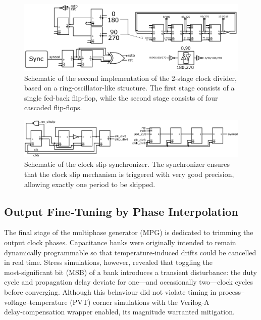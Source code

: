 \begin{figure}[H]
  \centering
  \includegraphics[width=\linewidth]{figures/Schematics/div_V2_complete.png}
  \caption{Schematic of the second implementation of the 2-stage clock divider, based on a ring-oscillator-like structure. The first stage consists of a single fed-back flip-flop, while the second stage consists of four cascaded flip-flops.}
  \label{fig:div_V2_complete}
\end{figure}
\begin{figure}[H]
  \centering
  \includegraphics[width=\linewidth]{figures/Schematics/sync_complete.png}
  \caption{Schematic of the clock slip synchronizer. The synchronizer ensures that the clock slip mechanism is triggered with very good precision, allowing exactly one period to be skipped.}
  \label{fig:sync}
\end{figure}

\subsection{Output Fine‑Tuning by Phase Interpolation}\label{sec:output_finetuning}

The final stage of the multiphase generator (MPG) is dedicated to trimming the output clock phases. Capacitance banks were originally intended to remain dynamically programmable so that temperature‑induced drifts could be cancelled in real time. Stress simulations, however, revealed that toggling the most‑significant bit (MSB) of a bank introduces a transient disturbance: the duty cycle and propagation delay deviate for one—and occasionally two—clock cycles before converging. Although this behaviour did not violate timing in process–voltage–temperature (PVT) corner simulations with the Verilog‑A delay‑compensation wrapper enabled, its magnitude warranted mitigation.

